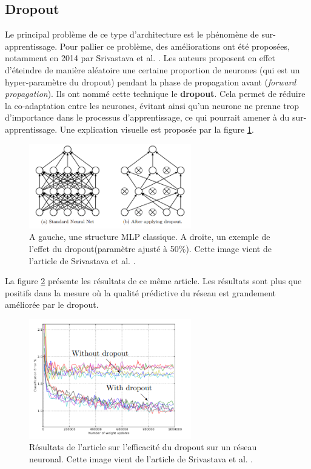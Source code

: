 \subsection{Dropout}

Le principal problème de ce type d'architecture est le phénomène de sur-apprentissage. Pour pallier ce problème, des améliorations ont été proposées, notamment en 2014 par Srivastava et al. \cite{srivastava_dropout_nodate}. Les auteurs proposent en effet d'éteindre de manière aléatoire une certaine proportion de neurones (qui est un hyper-paramètre du dropout) pendant la phase de propagation avant (\textit{forward propagation}). Ils ont nommé cette technique le \textbf{dropout}. Cela permet de réduire la co-adaptation entre les neurones, évitant ainsi qu'un neurone ne prenne trop d'importance dans le processus d'apprentissage, ce qui pourrait amener à du sur-apprentissage. Une explication visuelle est proposée par la figure \ref{dropout}.

\begin{figure}[!h]
\centering
\includegraphics[width=200pt]{images/cnn/dropout.png}
\caption{A gauche, une structure MLP classique. A droite, un exemple de l'effet du dropout(paramètre ajusté à 50\%). Cette image vient de l'article de Srivastava et al. \cite{srivastava_dropout_nodate}.}
\label{dropout}
\end{figure}

La figure \ref{dropout_article} présente les résultats de ce même article. Les résultats sont plus que positifs dans la mesure où la qualité prédictive du réseau est grandement améliorée par le dropout.

\begin{figure}[!h]
\centering
\includegraphics[width=200pt]{images/cnn/dropout_article.png}
\caption{Résultats de l'article sur l'efficacité du dropout sur un réseau neuronal. Cette image vient de l'article de Srivastava et al. \cite{srivastava_dropout_nodate}.}
\label{dropout_article}
\end{figure}
 
